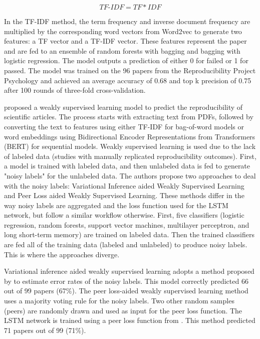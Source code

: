 \documentclass[12pt, a4paper, twocolumn]{article}
\begin{document}
			\begin{equation}
				\textit{TF-IDF} = TF * IDF
			\end{equation}

			In the TF-IDF method, the term frequency and inverse document frequency are multiplied by the corresponding word vectors from Word2vec to generate two features: a TF vector and a TF-IDF vector. These features represent the paper and are fed to an ensemble of random forests with bagging and bagging with logistic regression. The model outputs a prediction of either 0 for failed or 1 for passed. The model was trained on the 96 papers from the Reproducibility Project Psychology and achieved an average accuracy of 0.68 and top k precision of 0.75 after 100 rounds of three-fold cross-validation.

			\citet{luo2020research} proposed a weakly supervised learning model to predict the reproducibility of scientific articles. The process starts with extracting text from PDFs, followed by converting the text to features using either TF-IDF for bag-of-word models or word embeddings using Bidirectional Encoder Representations from Transformers (BERT) for sequential models. Weakly supervised learning is used due to the lack of labeled data (studies with manually replicated reproducibility outcomes). First, a model is trained with labeled data, and then unlabeled data is fed to generate "noisy labels" for the unlabeled data. The authors propose two approaches to deal with the noisy labels: Variational Inference aided Weakly Supervised Learning and Peer Loss aided Weakly Supervised Learning. These methods differ in the way noisy labels are aggregated and the loss function used for the LSTM network, but follow a similar workflow otherwise. First, five classifiers (logistic regression, random forests, support vector machines, multilayer perceptron, and long short-term memory) are trained on labeled data. Then the trained classifiers are fed all of the training data (labeled and unlabeled) to produce noisy labels. This is where the approaches diverge.
			
			Variational inference aided weakly supervised learning adopts a method proposed by \citet{Liu2012VariationalIF} to estimate error rates of the noisy labels. This model correctly predicted 66 out of 99 papers (67\%). The peer loss-aided weakly supervised learning method uses a majority voting rule for the noisy labels. Two other random samples (peers) are randomly drawn and used as input for the peer loss function. The LSTM network is trained using a peer loss function from \citet{liu2020peer}. This method predicted 71 papers out of 99 (71\%).
\end{document}
